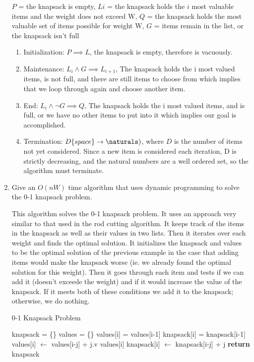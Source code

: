 \documentclass{article}
\begin{document}
\begin{enumerate}
$P$ = the knapsack is empty, $Li$ = the knapsack holds the $i$ most valuable items and the weight does not exceed W, $Q$ = the knapsack holds the most valuable set of items possible for weight W, $G$ = items remain in the list, or the knapsack isn't full
    \begin{enumerate}
        \item Initialization: $P \implies L$, the knapsack is empty, therefore is vacuously.
        \item Maintenance: $L_{i} \land G \implies L_{i+1}$, The knapsack holds the i most valued items, is not full, and there are still items to choose from which implies that we loop through again and choose another item.
        \item End: $L_{i} \land \neg G \implies Q$, The knapsack holds the i most valued items, and is full, or we have no other items to put into it which implies our goal is accomplished.
        \item Termination: $D\{space\} \rightarrow \naturals)$, where $D$ is the number of items not yet considered. Since a new item is considered each iteration, D is strictly decreasing, and the natural numbers are a well ordered set, so the algorithm must terminate.
    \end{enumerate}
    
    \item Give an $O(nW)$ time algorithm that uses dynamic programming to solve
        the 0-1 knapsack problem.
        
This algorithm solves the 0-1 knapsack problem. It uses an approach very similar to that used in the rod cutting algorithm. It keeps track of the items in the knapsack as well as their values in two lists. Then it iterates over each weight and finds the optimal solution. It initializes the knapsack and values to be the optimal solution of the previous example in the case that adding items would make the knapsack worse (ie. we already found the optimal solution for this weight). Then it goes through each item and tests if we can add it (doesn't exceede the weight) and if it would increase the value of the knapsack. If it meets both of these conditions we add it to the knapsack; otherwise, we do nothing.
        
\begin{algorithm}
    \caption{0-1 Knapsack Problem}\label{knap}
    \begin{algorithmic}[1]
      \State knapsack = \{\}
      \State values = \{\}
      	\State values[i] = values[i-1]
      	\State knapsack[i] = knapsack[i-1]
      			\State values[i] $\gets$ values[i-j] + j.v values[i]
      			\State knapsack[i] $\gets$ knapsack[i-j] + j
      		\EndIf
      	\EndFor
      \EndFor
      \State \textbf{return} knapsack
    \EndFunction
    \end{algorithmic}
\end{algorithm} 


\end{enumerate}
\end{document}
